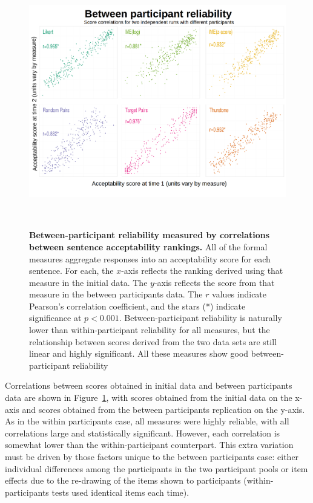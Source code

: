 \documentclass[doc]{apa6}
\newcommand{\initial}{{\sc initial}}
\newcommand{\withinppnt}{{\sc within participants}}
\newcommand{\betweenppnt}{{\sc between participants}}
\begin{document}
\begin{figure}[t]
\centering
\includegraphics[height=11cm,keepaspectratio]{figures/between_cor.png}
\caption{{\small {\bf Between-participant reliability measured by correlations between sentence acceptability rankings.} All of the formal measures aggregate responses into an acceptability score for each sentence. For each, the $x$-axis reflects the ranking derived using that measure in the \initial{} data. The $y$-axis reflects the score from that measure in the \betweenppnt{} data. The $r$ values indicate Pearson's correlation coefficient, and the stars (*) indicate significance at $p<0.001$. Between-participant reliability is naturally lower than within-participant reliability for all measures, but the relationship between scores derived from the two data sets are still linear and highly significant. All these measures show good between-participant reliability}}
\label{betweencorrelations}
\end{figure}

Correlations between scores obtained in \initial{} data and \betweenppnt{} data are shown in Figure~\ref{betweencorrelations}, with scores obtained from the \initial{} data on the x-axis and scores obtained from the \betweenppnt{} replication on the y-axis. As in the \withinppnt{} case, all measures were highly reliable, with all correlations large and statistically significant. However, each correlation is somewhat lower than the within-participant counterpart. This extra variation must be driven by those factors unique to the \betweenppnt{} case: either individual differences among the participants in the two participant pools or item effects due to the re-drawing of the items shown to participants (within-participants tests used identical items each time).
\end{document}
